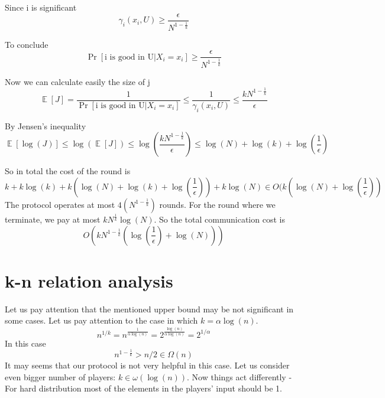 \documentclass{article}
\theoremstyle{plain}
\begin{document}
Since i is significant
\begin{equation*}
    \gamma_i(x_i, U) \geq \frac{\epsilon}{N^{1-\frac{1}{k}}}
\end{equation*}

To conclude
\begin{equation*}
    \Pr[\text{i is good in U}| X_i = x_i] \geq \frac{\epsilon}{N^{1-\frac{1}{k}}}
\end{equation*}

Now we can calculate easily the size of j
\begin{equation*}
    \mathop{\mathbb{E}} [J] = \frac{1}{\Pr[\text{i is good in U}| X_i = x_i]} \leq \frac{1}{\gamma_i(x_i, U)} \leq \frac{kN^{1-\frac{1}{k}}}{\epsilon}
\end{equation*}

By Jensen's inequality
\begin{equation*}
    \mathop{\mathbb{E}} [\log(J)] \leq \log(\mathop{\mathbb{E}} [J]) \leq \log(\frac{kN^{1-\frac{1}{k}}}{\epsilon}) \leq \log(N) + \log(k) + \log(\frac{1}{\epsilon})
\end{equation*}

So in total the cost of the round is 
\begin{equation*}
    k + k\log(k) + k(\log(N) + \log(k) + \log(\frac{1}{\epsilon})) + k\log(N) \in O(k(\log(N) + \log(\frac{1}{\epsilon}))
\end{equation*}
The protocol operates at most $4(N^{1-\frac{1}{k}})$ rounds. \newline
For the round where we terminate, we pay at most $kN^{\frac{1}{k}} \log(N)$. \newline
So the total communication cost is  
\begin{equation*}
    O(kN^{1-\frac{1}{k}}(\log(\frac{1}{\epsilon}) + \log(N)))
\end{equation*}
\section{k-n relation analysis}
Let us pay attention that the mentioned upper bound may be not significant in some cases. Let us pay attention to the case in which $k = \alpha\log(n)$.
\begin{equation*}
    n^{1/k} = n^{\frac{1}{\alpha\log(n)}} = 2^{\frac{\log(n)}{\alpha\log(n)}} = 2^{1/\alpha}
\end{equation*}
In this case
\begin{equation*}
    n^{1-\frac{1}{k}} > n/2 \in \Omega(n)
\end{equation*}
It may seems that our protocol is not very helpful in this case. \newline
Let us consider even bigger number of players: $k \in \omega(\log(n))$. \newline
Now things act differently - For hard distribution most of the elements in the players' input should be 1. 
\end{document}
